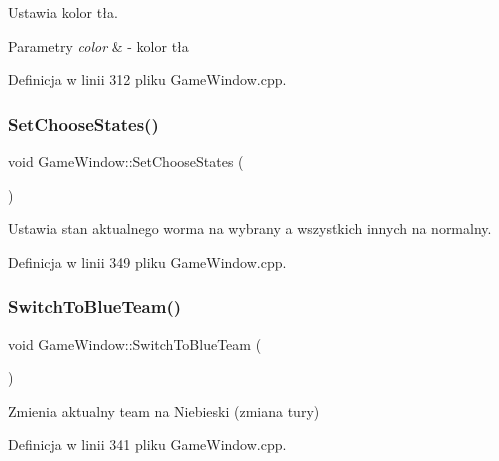 Ustawia kolor tła. 


\begin{DoxyParams}{Parametry}
{\em color} & -\/ kolor tła \\
\hline
\end{DoxyParams}


Definicja w linii 312 pliku Game\+Window.\+cpp.

\mbox{\label{class_game_window_a24b9dd0b93ad629da3b2e15661fdea0c}} 
\subsubsection{\texorpdfstring{Set\+Choose\+States()}{SetChooseStates()}}
{\footnotesize\ttfamily void Game\+Window\+::\+Set\+Choose\+States (\begin{DoxyParamCaption}{ }\end{DoxyParamCaption})}



Ustawia stan aktualnego worma na wybrany a wszystkich innych na normalny. 



Definicja w linii 349 pliku Game\+Window.\+cpp.

\mbox{\label{class_game_window_aa7c5976b188b842fc2ce45190b55bdfa}} 
\subsubsection{\texorpdfstring{Switch\+To\+Blue\+Team()}{SwitchToBlueTeam()}}
{\footnotesize\ttfamily void Game\+Window\+::\+Switch\+To\+Blue\+Team (\begin{DoxyParamCaption}{ }\end{DoxyParamCaption})}



Zmienia aktualny team na Niebieski (zmiana tury) 



Definicja w linii 341 pliku Game\+Window.\+cpp.

\mbox{\label{class_game_window_a735db6bd1918401c3b36502d14c8fd7b}} 

